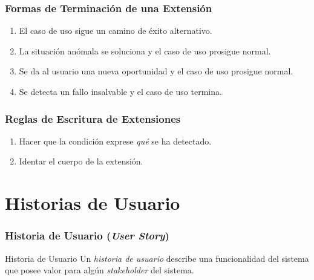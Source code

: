 \documentclass[slidestop,xcolor=pst,dvips,blue]{beamer}
\begin{document}
\begin{frame}[c]
    \frametitle{Formas de Terminación de una Extensión}
    \begin{enumerate}[<+->]
        \item El caso de uso sigue un camino de éxito alternativo.
        \item La situación anómala se soluciona y el caso de uso prosigue normal.
        \item Se da al usuario una nueva oportunidad y el caso de uso prosigue normal.
        \item Se detecta un fallo insalvable y el caso de uso termina.
     \end{enumerate}
\end{frame}

\begin{frame}[c]
    \frametitle{Reglas de Escritura de Extensiones}
    \begin{enumerate}[<+->]
        \item Hacer que la condición exprese \alert{\emph{qué}} se ha detectado.
        \item Identar el cuerpo de la extensión.
    \end{enumerate}
\end{frame}

\section{Historias de Usuario}

\begin{frame}[c]
	\frametitle{Historia de Usuario (\emph{User Story})}
	\begin{block}{Historia de Usuario}
        Un \emph{historia de usuario} describe una funcionalidad del sistema que posee valor para algún \emph{stakeholder} del sistema.
	\end{block}
\end{frame}
\end{document}
